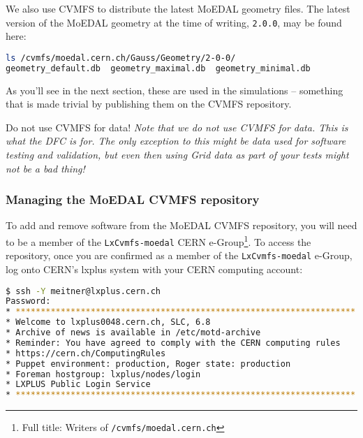 We also use \ac{CVMFS} to distribute the latest \ac{MoEDAL}
geometry files. The latest version of the MoEDAL geometry
at the time of writing, \texttt{2.0.0}, may be found here:

\begin{lstlisting}[gobble=0,numbers=none,language=bash]
ls /cvmfs/moedal.cern.ch/Gauss/Geometry/2-0-0/
geometry_default.db  geometry_maximal.db  geometry_minimal.db
\end{lstlisting}

As you'll see in the next section, these are used in the
simulations -- something that is made trivial by publishing them
on the \ac{CVMFS} repository.

\begin{warningbox}{Do not use CVMFS for data!}
\emph{Note that we do not use CVMFS for data. This is what the
\ac{DFC} is for. The only exception to this might be data used for
software testing and validation, but even then using Grid data
as part of your tests might not be a bad thing!}
\end{warningbox}

\clearpage


\subsubsection{Managing the MoEDAL CVMFS repository}
\label{sec:moedalcvmfsmanaging}

To add and remove software from the MoEDAL \ac{CVMFS} repository,
you will need to be a member of the
\texttt{LxCvmfs-moedal} \acs{CERN} e-Group\footnote{
Full title: Writers of \texttt{/cvmfs/moedal.cern.ch}}.
To access the repository, once you are confirmed as a member of the
\texttt{LxCvmfs-moedal} e-Group, log onto \acs{CERN}'s lxplus system
with your \acs{CERN} computing account:

\begin{lstlisting}[gobble=0,numbers=none,language=bash]
$ ssh -Y meitner@lxplus.cern.ch
Password: 
* ********************************************************************
* Welcome to lxplus0048.cern.ch, SLC, 6.8
* Archive of news is available in /etc/motd-archive
* Reminder: You have agreed to comply with the CERN computing rules
* https://cern.ch/ComputingRules
* Puppet environment: production, Roger state: production
* Foreman hostgroup: lxplus/nodes/login
* LXPLUS Public Login Service
* ********************************************************************
\end{lstlisting}

